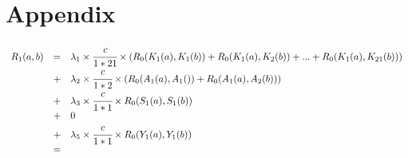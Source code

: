 \section*{Appendix}



\begin{math}
\begin{array}{lcl}
R_1(a,b) & = & 
        \lambda_1\times\cfrac{c}{1*21}\times(R_0(K_1(a),K_1(b)) + R_0(K_1(a),K_2(b))+... + R_0(K_1(a),K_{21}(b)))
        \\ & + &
        \lambda_2\times\cfrac{c}{1*2}\times(R_0(A_1(a),A_1()) + R_0(A_1(a),A_2(b)))
        \\ & + &
        \lambda_3\times\cfrac{c}{1*1}\times R_0(S_1(a),S_1(b))
        \\ & + &
        0
        \\ & + &
        \lambda_5\times\cfrac{c}{1*1}\times R_0(Y_1(a),Y_1(b))
        \\ & = &

\end{array}
\end{math}



